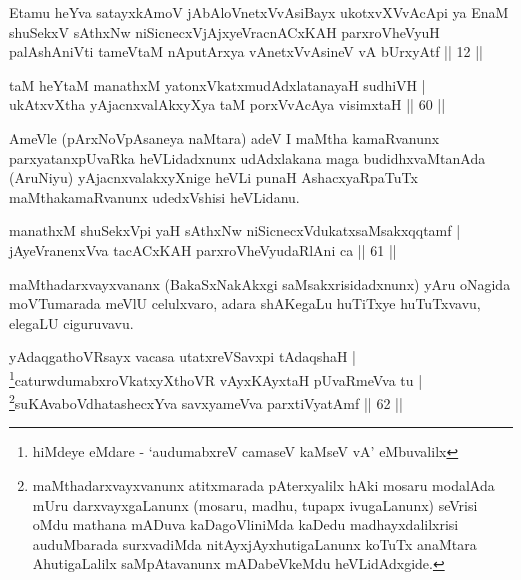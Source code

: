 \begin{kandikeshl}
Etamu heYva satayxkAmoV jAbAloV\s netxVvAsiBayx ukotxvXVvAcApi ya EnaM shuSekxV sAthxNw niSicnecxVjAjxyeVracnACxKAH parxroVheVyuH palAshAniVti tameVtaM nAputArxya vAnetxVvAsineV vA bUrxyAtf || 12 ||
\end{kandikeshl}


\begin{shl}
taM heYtaM manathxM yatonxVkatxmudAdxlatanayaH sudhiVH | \\
ukAtxvX\s tha yAjacnxvalAkxyXya taM porxVvAcAya visimxtaH \hfill|| 60 || 
\end{shl}

\begin{artha}
AmeVle (pArxNoVpAsaneya naMtara) adeV I maMtha kamaRvanunx 
parxyatanxpUvaRka heVLidadxnunx udAdxlakana maga budidhxvaMtanAda 
(AruNiyu) yAjacnxvalakxyXnige heVLi punaH AshacxyaRpaTuTx 
maMthakamaRvanunx udedxVshisi heVLidanu.
\end{artha}


\begin{shl}
manathxM shuSekxV\s pi yaH sAthxNw niSicnecxVdukatxsaMsakxqqtamf | \\
jAyeVranenxVva tacACxKAH parxroVheVyudaRlAni ca \hfill|| 61 || 
\end{shl}

\begin{artha}
maMthadarxvayxvananx (BakaSxNakAkxgi saMsakxrisidadxnunx) yAru oNagida 
moVTumarada meVlU celulxvaro, adara shAKegaLu huTiTxye huTuTxvavu, 
elegaLU ciguruvavu.
\end{artha}


\begin{shl}
yAdaqgathoVR\s sayx vacasa utatxreVSavxpi tAdaqshaH | \\
\footnote{hiMdeye eMdare - `audumabxreV camaseV kaMseV vA' eMbuvalilx}caturwdumabxroVkatxyXthoVR vAyxKAyxtaH pUvaRmeVva tu | \\
\footnote{maMthadarxvayxvanunx atitxmarada pAterxyalilx hAki mosaru 
modalAda mUru darxvayxgaLanunx (mosaru, madhu, tupapx ivugaLanunx) 
seVrisi oMdu mathana mADuva kaDagoVliniMda kaDedu madhayxdalilxrisi 
auduMbarada surxvadiMda nitAyxjAyxhutigaLanunx koTuTx anaMtara 
AhutigaLalilx saMpAtavanunx mADabeVkeMdu heVLidAdxgide.}suKAvaboVdhatashecxYva savxyameVva parxtiVyatAmf \hfill|| 62 || 
\end{shl}


